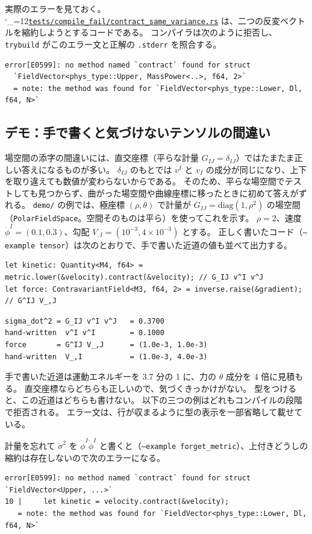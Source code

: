 \documentclass[a4paper,11pt]{ltjsarticle}
\newcommand{\code}[1]{\texttt{#1}}
\newcommand{\repourl}{https://github.com/inuverse44/phys-type}
\newcommand{\reporev}{b1fea87}
\newcommand{\repoas}{\begingroup\catcode`\_=12\relax\repoasaux}
\newcommand{\repoasaux}[2]{\href{\repourl/blob/\reporev/#1}{\texttt{#2}}\endgroup}
\begin{document}
実際のエラーを見ておく。
\repoas{crates/phys-type/tests/compile_fail/contract_same_variance.rs}{tests/compile_fail/contract_same_variance.rs} は、二つの反変ベクトルを縮約しようとするコードである。
コンパイラは次のように拒否し、\code{trybuild} がこのエラー文と正解の \code{.stderr} を照合する。
\begin{lstlisting}
error[E0599]: no method named `contract` found for struct
  `FieldVector<phys_type::Upper, MassPower<..>, f64, 2>`
  = note: the method was found for `FieldVector<phys_type::Lower, Dl, f64, N>`
\end{lstlisting}

\subsection{デモ：手で書くと気づけないテンソルの間違い}
\label{sec:tensor-demo}

場空間の添字の間違いには、直交座標（平らな計量 $G_{IJ}=\delta_{IJ}$）ではたまたま正しい答えになるものが多い。
$\delta_{IJ}$ のもとでは $v^I$ と $v_I$ の成分が同じになり、上下を取り違えても数値が変わらないからである。
そのため、平らな場空間でテストしても見つからず、曲がった場空間や曲線座標に移ったときに初めて答えがずれる。
\code{demo/} の例では、極座標 $(\rho,\theta)$ で計量が $G_{IJ}=\mathrm{diag}(1,\rho^2)$ の場空間（\code{PolarFieldSpace}。空間そのものは平ら）を使ってこれを示す。
$\rho=2$、速度 $\dot\phi^I=(0.1,0.3)$、勾配 $V_{,I}=(10^{-3},4\times10^{-3})$ とする。
正しく書いたコード（\code{--example tensor}）は次のとおりで、手で書いた近道の値も並べて出力する。
\begin{lstlisting}
let kinetic: Quantity<M4, f64> = metric.lower(&velocity).contract(&velocity); // G_IJ v^I v^J
let force: ContravariantField<M3, f64, 2> = inverse.raise(&gradient);         // G^IJ V_,J
\end{lstlisting}
\begin{lstlisting}[language={}]
sigma_dot^2 = G_IJ v^I v^J   = 0.3700
hand-written  v^I v^I        = 0.1000
force       = G^IJ V_,J      = (1.0e-3, 1.0e-3)
hand-written  V_,I           = (1.0e-3, 4.0e-3)
\end{lstlisting}
手で書いた近道は運動エネルギーを 3.7 分の 1 に、力の $\theta$ 成分を 4 倍に見積もる。
直交座標ならどちらも正しいので、気づくきっかけがない。
型をつけると、この近道はどちらも書けない。
以下の三つの例はどれもコンパイルの段階で拒否される。
エラー文は、行が収まるように型の表示を一部省略して載せている。

計量を忘れて $\dot\sigma^2$ を $\dot\phi^I\dot\phi^I$ と書くと（\code{--example forget\_metric}）、上付きどうしの縮約は存在しないので次のエラーになる。
\begin{lstlisting}[language={}]
error[E0599]: no method named `contract` found for struct `FieldVector<Upper, ...>`
10 |     let kinetic = velocity.contract(&velocity);
   = note: the method was found for `FieldVector<phys_type::Lower, Dl, f64, N>`
\end{lstlisting}
\end{document}
